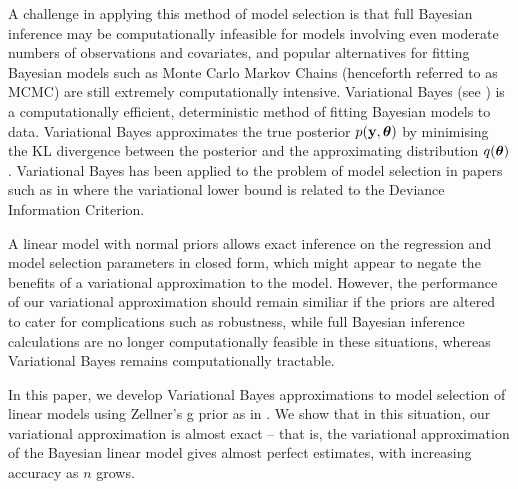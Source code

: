 \documentclass{amsart}[12pt]
\begin{document}


A challenge in applying this method of model selection is that full Bayesian inference may be computationally
infeasible for models involving even moderate numbers of observations and covariates, and popular alternatives
for fitting Bayesian models such as Monte Carlo Markov Chains (henceforth referred to as MCMC) are still
extremely computationally intensive. Variational Bayes (see \citep{Ormerod2010}) is a computationally
efficient, deterministic method of fitting Bayesian models to data. Variational Bayes approximates the true
posterior $p({\bf y}, {\boldsymbol \theta})$ by minimising the KL divergence between the posterior and the  approximating
distribution $q({\boldsymbol \theta})$. Variational Bayes has been applied to the problem of model selection in papers such
as in \citep{McGrory2007} where the variational lower bound is related to the Deviance Information Criterion.

A linear model with normal priors allows exact inference on the regression and model selection parameters in
closed form, which might appear to negate the benefits of a variational approximation to the model. However,
the performance of our variational approximation should remain similiar if the priors are altered to cater for
complications such as robustness, while full Bayesian inference calculations are no longer computationally
feasible in these situations, whereas Variational Bayes remains computationally tractable.






In this paper, we develop Variational Bayes approximations to model selection of linear models using Zellner's
g prior as in \citep{Liang2008}. We show that in this situation, our variational approximation is almost exact
-- that is, the variational approximation of the Bayesian linear model gives almost perfect estimates, with
increasing accuracy as $n$ grows.

\end{document}
